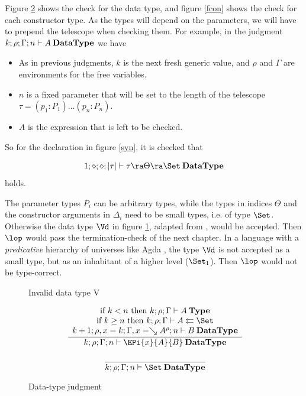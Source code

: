 Figure \ref{fdata} shows the check for the data type, and figure \ref{fcon} shows the check for each constructor type.
As the types will depend on the parameters, we will have to prepend the telescope when checking them.
For example, in the judgment $k;\rho;\Gamma;n\vdash A\:\mathbf{DataType}$ we have
\begin{itemize}
\item
As in previous judgments, $k$ is the next fresh generic value, and $\rho$ and $\Gamma$ are environments for the free variables.
\item
$n$ is a fixed parameter that will be set to the length of the telescope $\tau = ( p_1 : P_1) \ldots ( p_n : P_n)$. 
\item
$A$ is the expression that is left to be checked.
\end{itemize}
So for the declaration in figure \ref{syn}, it is checked that 

\[\DataType{1}{\diamond}{\diamond}{|\tau|}{\tau \ra \Theta \ra \Set}\] holds.

The parameter types $P_i$ can be arbitrary types, while the types in indices $\Theta$  and the constructor arguments in $\Delta_i$  need to be small types, i.e. of type $\Set$. 
Otherwise the data type $\Vd$ in figure \ref{fv}, adapted from \cite{coquand92pattern}, would be accepted.
Then $\lop$ would pass the termination-check of the next chapter. In a language with a \emph{predicative} hierarchy of universes like Agda \cite{norell:thesis}, the type $\Vd$ is not accepted as a small type, but as an inhabitant of a higher level ($\Set_1$). Then $\lop$ would not be type-correct.



\begin{figure}[htp]
\caption{Invalid data type V}
\label{fv}
\end{figure}


\begin{figure}[htp]
\begin{gather*}
\nxru{}
{\mbox {if } k < n \mbox{ then } \IsType{k}{\rho}{\Gamma}{A}}
{\mbox {if } k \geq n \mbox { then } \Check{k}{\rho}{\Gamma}{A}{\Set}}
{\DataType{k+1}{\ins{\rho}{x}{k}}{\ins{\Gamma}{x}{\wh \cl{A}{\rho}}}{n}{B}}
{\DataType{k}{\rho}{\Gamma}{n}{\EPi{x}{A}{B}}}
\\[2ex]
\nru{}
{}
{\DataType{k}{\rho}{\Gamma}{n}{\Set}}
\end{gather*}
\caption{Data-type judgment}
\label{fdata}
\end{figure}

